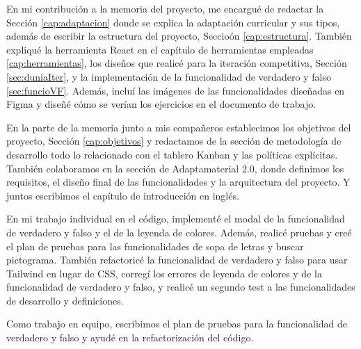 En mi contribución a la memoria del proyecto, me encargué de redactar la Sección \ref{cap:adaptacion} donde se explica la adaptación curricular y sus tipos, además de escribir la estructura del proyecto, Seccioón \ref{cap:estructura}. También expliqué la herramienta React en el capítulo de herramientas empleadas \ref{cap:herramientas}, los diseños que realicé para la iteración competitiva, Sección \ref{sec:duniaIter}, y la implementación de la funcionalidad de verdadero y falso \ref{sec:funcioVF}. Además, incluí las imágenes de las funcionalidades diseñadas en Figma y diseñé cómo se verían los ejercicios en el documento de trabajo.

En la parte de la memoria junto a mis compañeros establecimos los objetivos del proyecto, Sección \ref{cap:objetivos} y redactamos de la sección de metodología de desarrollo todo lo relacionado con el tablero Kanban y las políticas explícitas. También colaboramos en la sección de Adaptamaterial 2.0, donde definimos los requisitos, el diseño final de las funcionalidades y la arquitectura del proyecto. Y juntos escribimos el capítulo de introducción en inglés.

En mi trabajo individual en el código, implementé el modal de la funcionalidad de verdadero y falso y el de la leyenda de colores. Además, realicé pruebas y creé el plan de pruebas para las funcionalidades de sopa de letras y buscar pictograma. También refactoricé la funcionalidad de verdadero y falso para usar Tailwind en lugar de CSS, corregí los errores de leyenda de colores y de la funcionalidad de verdadero y falso, y realicé un segundo test a las funcionalidades de desarrollo y definiciones. 

Como trabajo en equipo, escribimos el plan de pruebas para la funcionalidad de verdadero y falso y ayudé en la refactorización del código.

